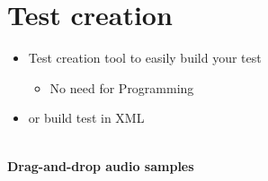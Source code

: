 \vspace{-0.8cm}
\section{Test creation} %

\begin{itemize}
	\item Test creation tool to easily build your test
	\begin{itemize}
		\item No need for Programming
	\end{itemize}
	\item or build test in XML
\end{itemize}

\begin{center}
\\ %
\small
\textbf{Drag-and-drop audio samples}
\end{center}